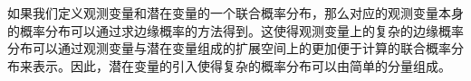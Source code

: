 如果我们定义观测变量和潜在变量的一个联合概率分布，那么对应的观测变量本身的概率分布可以通过求边缘概率的方法得到。这使得观测变量上的复杂的边缘概率分布可以通过观测变量与潜在变量组成的扩展空间上的更加便于计算的联合概率分布来表示。因此，潜在变量的引入使得复杂的概率分布可以由简单的分量组成。